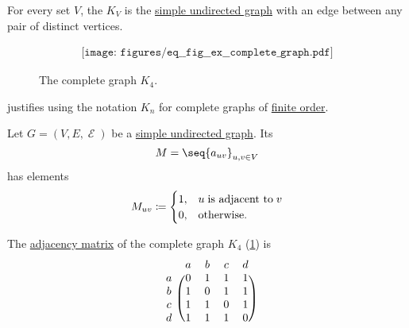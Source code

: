 \begin{example}\label{ex:complete_graph}
  For every set \( V \), the  \( K_V \) is the \hyperref[def:undirected_multigraph]{simple undirected graph} with an edge between any pair of distinct vertices.

  \begin{figure}
    \begin{equation}\label{eq:fig:ex:complete_graph}
      \begin{aligned}
        \texttt{[image: figures/eq\_\_fig\_\_ex\_\_complete\_graph.pdf]}
      \end{aligned}
    \end{equation}
    \caption{The complete graph \( K_4 \).}\label{fig:ex:complete_graph}
  \end{figure}

   justifies using the notation \( K_n \) for complete graphs of \hyperref[def:hypergraph/order]{finite order}.
\end{example}

\begin{definition}\label{def:graph_adjacency_matrix}
  Let \( G = (V, E, \mscrE) \) be a \hyperref[def:undirected_multigraph]{simple undirected graph}. Its 
  \begin{equation*}
    M = \seq{ a_{uv} }_{u, v \in V}
  \end{equation*}
  has elements
  \begin{equation*}
    M_{uv} \coloneqq \begin{cases}
      1, &u \T{is adjacent to} v \\
      0, &\T{otherwise.}
    \end{cases}
  \end{equation*}
\end{definition}

\begin{example}\label{ex:def:graph_adjacency_matrix}
  The \hyperref[def:graph_adjacency_matrix]{adjacency matrix} of the complete graph \( K_4 \) (\cref{fig:ex:complete_graph}) is
  \begin{equation}\label{eq:ex:def:graph_adjacency_matrix}
    \begin{blockarray}{ccccc}
        & a & b & c & d \\
    \begin{block}{c(cccc)}
      a & 0 & 1 & 1 & 1 \\
      b & 1 & 0 & 1 & 1 \\
      c & 1 & 1 & 0 & 1 \\
      d & 1 & 1 & 1 & 0 \\
    \end{block}
    \end{blockarray}
  \end{equation}
\end{example}

